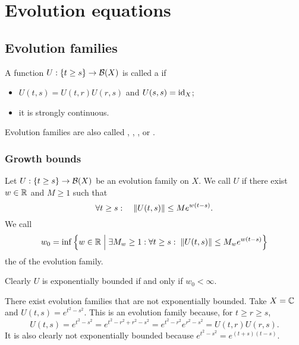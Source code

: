 \chapter{Evolution equations}
\section{Evolution families}
\begin{definition}
A function $U: \{t\geq s\}\to \operatorname{\mathcal{B}}(X)$ is called a  if
\begin{itemize}
\item $U(t,s) = U(t,r)U(r,s)$ and $U(s,s) = \operatorname{id}_X$;
\item it is strongly continuous.
\end{itemize}
Evolution families are also called , ,
,  or .
\end{definition}

\subsection{Growth bounds}
\begin{definition}
Let $U: \{t\geq s\}\to \operatorname{\mathcal{B}}(X)$ be an evolution family on $X$. We call $U$  if there exist $w\in\mathbb{R}$ and $M\geq 1$ such that
\[ \forall t\geq s:\quad \lVert U(t,s)\rVert \leq M e^{w(t-s)}. \]
We call
\[ w_0 = \inf\left\{ w\in \mathbb{R} \;\middle|\; \exists M_w \geq 1: \forall t\geq s:\; \lVert U(t,s)\rVert \leq M_w e^{w(t-s)}  \right\} \]
the  of the evolution family.
\end{definition}
Clearly $U$ is exponentially bounded if and only if $w_0 < \infty$.

\begin{example}
There exist evolution families that are not exponentially bounded. Take $X = \mathbb{C}$ and $U(t,s) = e^{t^2 - s^2}$. This is an evolution family because, for $t\geq r\geq s$,
\[ U(t,s) = e^{t^2 - s^2} = e^{t^2 - r^2 + r^2 - s^2} = e^{t^2 - r^2}e^{r^2 - s^2} = U(t,r)U(r,s). \]
It is also clearly not exponentially bounded because $e^{t^2 - s^2} = e^{(t+s)(t-s)}$.
\end{example}

